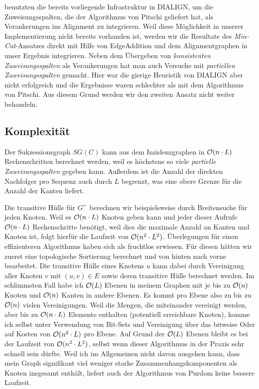 \cite{cpm10} benutzten die bereits vorliegende Infrastruktur in DIALIGN, um die Zuweisungsspalten, die der Algorithmus von Pitschi geliefert hat, als Verankerungen ins Alignment zu integrieren. Weil diese Möglichkeit in unserer Implementierung nicht bereits vorhanden ist, werden wir die Resultate des \emph{Min-Cut}-Ansatzes direkt mit Hilfe von \textrm{EdgeAddition} und dem Alignmentgraphen in unser Ergebnis integrieren. Neben dem Übergeben von \emph{konsistenten Zuweisungsspalten} als Verankerungen hat man auch Versuche mit \emph{partiellen Zuweisungsspalten} gemacht. Hier war die gierige Heuristik von DIALIGN aber nicht erfolgreich und die Ergebnisse waren schlechter als mit dem Algorithmus von Pitschi. Aus diesem Grund werden wir den zweiten Ansatz nicht weiter behandeln.

\subsection{Komplexität}

Der Sukzessionsgraph $SG(C)$ kann aus dem Inzidenzgraphen in $\mathcal{O}(n\cdot L)$ Rechenschritten berechnet werden, weil es höchstens so viele \emph{partielle Zuweisungsspalten} gegeben kann. Außerdem ist die Anzahl der direkten Nachfolger pro Sequenz auch durch $L$ begrenzt, was eine obere Grenze für die Anzahl der Kanten liefert.

Die transitive Hülle für $G^{+}$ berechnen wir beispielsweise durch Breitensuche für jeden Knoten. Weil es $\mathcal{O}(n\cdot L)$ Knoten geben kann und jeder dieser Aufrufe $\mathcal{O}(n\cdot L)$ Rechenschritte benötigt, weil dies die maximale Anzahl an Kanten und Knoten ist, folgt hierfür die Laufzeit von $\mathcal{O}(n^2\cdot L^2)$. Überlegungen für einen effizienteren Algorithmus haben sich als fruchtlos erwiesen. Für diesen hätten wir zuerst eine topologische Sortierung berechnet und von hinten nach vorne bearbeitet. Die transitive Hülle eines Knotens $u$ kann dabei durch Vereinigung aller Knoten $v$ mit $(u,v) \in E$ sowie deren transitive Hülle berechnet werden. Im schlimmsten Fall habe ich $\mathcal{O}(L)$ Ebenen in meinem Graphen mit je bis zu $\mathcal{O}(n)$ Knoten und $\mathcal{O}(n)$ Kanten in andere Ebenen. Es kommt pro Ebene also zu bis zu $\mathcal{O}(n)$ vielen Vereinigungen. Weil die Mengen, die miteinander vereinigt werden, aber bis zu $\mathcal{O}(n\cdot L)$ Elemente enthalten (potentiell erreichbare Knoten), komme ich selbst unter Verwendung von Bit-Sets und Vereinigung über das bitweise Oder auf Kosten von $\mathcal{O}(n^2\cdot L)$ pro Ebene. Auf Grund der $\mathcal{O}(L)$ Ebenen bleibt es bei der Laufzeit von $\mathcal{O}(n^2\cdot L^2)$, selbst wenn dieser Algorithmus in der Praxis sehr schnell sein dürfte. Weil ich im Allgemeinen nicht davon ausgehen kann, dass mein Graph signifikant viel weniger starke Zusammenhangskomponenten als Knoten insgesamt enthält, liefert auch der Algorithmus von Purdom keine bessere Laufzeit.

